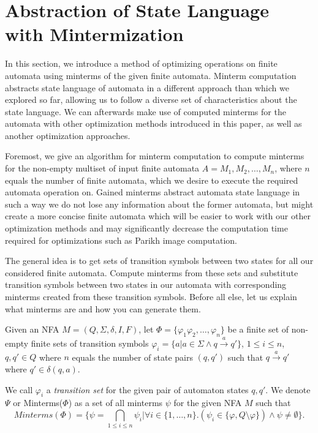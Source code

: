 \section{Abstraction of State Language with Mintermization}
In this section, we introduce a method of optimizing operations on finite automata using minterms of the given finite automata. Minterm computation abstracts state language of automata in a different approach than which we explored so far, allowing us to follow a diverse set of characteristics about the state language. We can afterwards make use of computed minterms for the automata with other optimization methods introduced in this paper, as well as another optimization approaches.

Foremost, we give an algorithm for minterm computation to compute minterms for the non-empty multiset of input finite automata $A = {M_1, M_2, \dots, M_n}$, where $n$ equals the number of finite automata, which we desire to execute the required automata operation on. Gained minterms abstract automata state language in such a way we do not lose any information about the former automata, but might create a more concise finite automata which will be easier to work with our other optimization methods and may significantly decrease the computation time required for optimizations such as Parikh image computation.

The general idea is to get sets of transition symbols between two states for all our considered finite automata. Compute minterms from these sets and substitute transition symbols between two states in our automata with corresponding minterms created from these transition symbols. Before all else, let us explain what minterms are and how you can generate them.

\begin{definition}
Given an NFA $M = (Q, \Sigma, \delta, I, F)$, let $\Phi = \{ \varphi_1 \varphi_2, \ldots, \varphi_n \}$ be a finite set of non-empty finite sets of transition symbols $\varphi_i = \{ a | a \in \Sigma \land q \xrightarrow{a} q' \}$, $ 1 \leq i \leq n$, $q, q' \in Q$ where $n$ equals the number of state pairs $(q, q')$ such that $q \xrightarrow{a} q'$ where $q' \in \delta(q, a)$.
\end{definition}

We call $\varphi_i$ a \emph{transition  set} for the given pair of automaton states $q, q'$. We denote $\Psi$ or Minterms($\Phi$) as a set of all minterms $\psi$ for the given NFA $M$ such that
$$ Minterms(\Phi) = \biggr\{ \psi = \bigcap_{1 \leq i \leq n} \psi_i \biggr|
\forall i \in \{1, \dots, n\} . (\psi_i \in \{ \varphi, Q \setminus \varphi \}) \land \psi \neq \emptyset \biggr\} \text{.} $$

